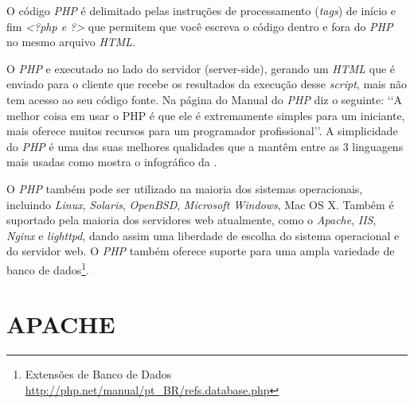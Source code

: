 \par
O código \textit{PHP} é delimitado pelas instruções de processamento (\textit{tags}) de início e fim \textit{<?php e ?>} que permitem que você escreva o código dentro e fora do \textit{PHP} no mesmo arquivo \textit{HTML}. \cite{php-intro}
\par
O \textit{PHP} e executado no lado do servidor (server-side), gerando um \textit{HTML} que é enviado para o cliente que recebe os resultados da execução desse \textit{script}, mais não tem acesso ao seu código fonte. Na página do Manual do \textit{PHP} diz o seguinte: \lq\lq A melhor coisa em usar o PHP é que ele é extremamente simples para um iniciante, mais oferece muitos recursos para um programador profissional\rq\rq {}. A simplicidade do \textit{PHP} é uma das suas melhores qualidades que a mantêm entre as 3 linguagens mais usadas como mostra o infográfico da .
\par
O \textit{PHP} também pode ser utilizado na maioria dos sistemas operacionais, incluindo \textit{Linux}, \textit{Solaris}, \textit{OpenBSD}, \textit{Microsoft Windows}, Mac OS X. Também é suportado pela maioria dos servidores web atualmente, como o \textit{Apache}, \textit{IIS}, \textit{Nginx} e \textit{lighttpd}, dando assim uma liberdade de escolha do sistema operacional e do servidor web. O \textit{PHP} também oferece suporte para uma ampla variedade de banco de dados\footnote{Extensões de Banco de Dados \url{http://php.net/manual/pt_BR/refs.database.php}}.


\section{APACHE}

